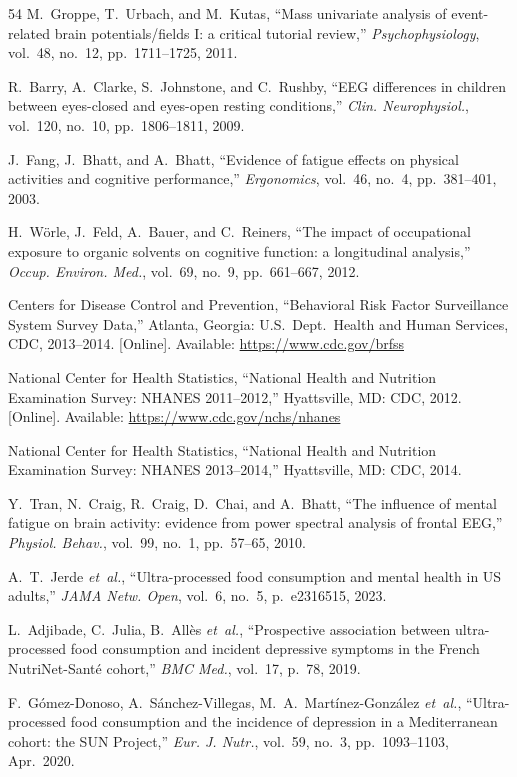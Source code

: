 \documentclass[journal,twoside,10pt]{IEEEtran}
\begin{document}
\begin{thebibliography}{54}
 M.~Groppe, T.~Urbach, and M.~Kutas, ``Mass univariate analysis of event-related brain potentials/fields I: a critical tutorial review,'' \textit{Psychophysiology}, vol.~48, no.~12, pp.~1711--1725, 2011.

 R.~Barry, A.~Clarke, S.~Johnstone, and C.~Rushby, ``EEG differences in children between eyes-closed and eyes-open resting conditions,'' \textit{Clin. Neurophysiol.}, vol.~120, no.~10, pp.~1806--1811, 2009.

 J.~Fang, J.~Bhatt, and A.~Bhatt, ``Evidence of fatigue effects on physical activities and cognitive performance,'' \textit{Ergonomics}, vol.~46, no.~4, pp.~381--401, 2003.

 H.~W\"{o}rle, J.~Feld, A.~Bauer, and C.~Reiners, ``The impact of occupational exposure to organic solvents on cognitive function: a longitudinal analysis,'' \textit{Occup. Environ. Med.}, vol.~69, no.~9, pp.~661--667, 2012.

 Centers for Disease Control and Prevention, ``Behavioral Risk Factor Surveillance System Survey Data,'' Atlanta, Georgia: U.S.~Dept.~Health and Human Services, CDC, 2013--2014. [Online]. Available: \url{https://www.cdc.gov/brfss}

 National Center for Health Statistics, ``National Health and Nutrition Examination Survey: NHANES 2011--2012,'' Hyattsville, MD: CDC, 2012. [Online]. Available: \url{https://www.cdc.gov/nchs/nhanes}

 National Center for Health Statistics, ``National Health and Nutrition Examination Survey: NHANES 2013--2014,'' Hyattsville, MD: CDC, 2014.

 Y.~Tran, N.~Craig, R.~Craig, D.~Chai, and A.~Bhatt, ``The influence of mental fatigue on brain activity: evidence from power spectral analysis of frontal EEG,'' \textit{Physiol. Behav.}, vol.~99, no.~1, pp.~57--65, 2010.

 A.~T.~Jerde \textit{et~al.}, ``Ultra-processed food consumption and mental health in US adults,'' \textit{JAMA Netw. Open}, vol.~6, no.~5, p.~e2316515, 2023.

 L.~Adjibade, C.~Julia, B.~All\`{e}s \textit{et~al.}, ``Prospective association between ultra-processed food consumption and incident depressive symptoms in the French NutriNet-Sant\'{e} cohort,'' \textit{BMC Med.}, vol.~17, p.~78, 2019.

 F.~G\'{o}mez-Donoso, A.~S\'{a}nchez-Villegas, M.~A.~Mart\'{i}nez-Gonz\'{a}lez \textit{et~al.}, ``Ultra-processed food consumption and the incidence of depression in a Mediterranean cohort: the SUN Project,'' \textit{Eur. J. Nutr.}, vol.~59, no.~3, pp.~1093--1103, Apr.~2020.


\end{thebibliography}
\end{document}

